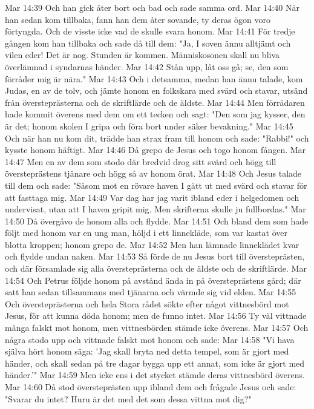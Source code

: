 Mar 14:39  Och han gick åter bort och bad och sade samma ord.
Mar 14:40  När han sedan kom tillbaka, fann han dem åter sovande, ty deras ögon voro förtyngda. Och de visste icke vad de skulle svara honom.
Mar 14:41  För tredje gången kom han tillbaka och sade då till dem: "Ja, I soven ännu alltjämt och vilen eder! Det är nog. Stunden är kommen. Människosonen skall nu bliva överlämnad i syndarnas händer.
Mar 14:42  Stån upp, låt oss gå; se, den som förråder mig är nära."
Mar 14:43  Och i detsamma, medan han ännu talade, kom Judas, en av de tolv, och jämte honom en folkskara med svärd och stavar, utsänd från översteprästerna och de skriftlärde och de äldste.
Mar 14:44  Men förrädaren hade kommit överens med dem om ett tecken och sagt: "Den som jag kysser, den är det; honom skolen I gripa och föra bort under säker bevakning."
Mar 14:45  Och när han nu kom dit, trädde han strax fram till honom och sade: "Rabbi!" och kysste honom häftigt.
Mar 14:46  Då grepo de Jesus och togo honom fången.
Mar 14:47  Men en av dem som stodo där bredvid drog sitt svärd och högg till översteprästens tjänare och högg så av honom örat.
Mar 14:48  Och Jesus talade till dem och sade: "Såsom mot en rövare haven I gått ut med svärd och stavar för att fasttaga mig.
Mar 14:49  Var dag har jag varit ibland eder i helgedomen och undervisat, utan att I haven gripit mig. Men skrifterna skulle ju fullbordas."
Mar 14:50  Då övergåvo de honom alla och flydde.
Mar 14:51  Och bland dem som hade följt med honom var en ung man, höljd i ett linnekläde, som var kastat över blotta kroppen; honom grepo de.
Mar 14:52  Men han lämnade linneklädet kvar och flydde undan naken.
Mar 14:53  Så förde de nu Jesus bort till översteprästen, och där församlade sig alla översteprästerna och de äldste och de skriftlärde.
Mar 14:54  Och Petrus följde honom på avstånd ända in på översteprästens gård; där satt han sedan tillsammans med tjänarna och värmde sig vid elden.
Mar 14:55  Och översteprästerna och hela Stora rådet sökte efter något vittnesbörd mot Jesus, för att kunna döda honom; men de funno intet.
Mar 14:56  Ty väl vittnade många falskt mot honom, men vittnesbörden stämde icke överens.
Mar 14:57  Och några stodo upp och vittnade falskt mot honom och sade:
Mar 14:58  "Vi hava själva hört honom säga: 'Jag skall bryta ned detta tempel, som är gjort med händer, och skall sedan på tre dagar bygga upp ett annat, som icke är gjort med händer.'"
Mar 14:59  Men icke ens i det stycket stämde deras vittnesbörd överens.
Mar 14:60  Då stod översteprästen upp ibland dem och frågade Jesus och sade: "Svarar du intet? Huru är det med det som dessa vittna mot dig?"
